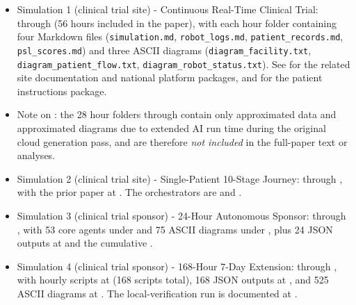 \begin{itemize}[leftmargin=*]
\item Simulation 1 (clinical trial site) - Continuous Real-Time
Clinical Trial:  through
 (56 hours included in the paper), with each hour
folder containing four Markdown files (\texttt{simulation.md},
\texttt{robot\_logs.md}, \texttt{patient\_records.md},
\texttt{psl\_scores.md}) and three ASCII diagrams
(\texttt{diagram\_facility.txt}, \texttt{diagram\_patient\_flow.txt},
\texttt{diagram\_robot\_status.txt}). See
\cite{kawchak_2026_19176370, kawchak_2026_19244918} for the related
site documentation and national platform packages, and
\cite{kawchak_2026_18810541} for the patient instructions package.

\item Note on : the 28 hour folders
 through
 contain only approximated data and approximated
diagrams due to extended AI run time during the original cloud
generation pass, and are therefore \emph{not included} in the
full-paper text or analyses.  

\clearpage

\item Simulation 2 (clinical trial site) - Single-Patient 10-Stage
Journey:  through
, with the prior paper at
. The
orchestrators are  and
 \cite{kawchak_2026_19119939}.

\item Simulation 3 (clinical trial sponsor) - 24-Hour Autonomous
Sponsor: 
through , with 53 core agents under
 and 75 ASCII diagrams
under , plus 24 JSON
outputs at  and the
cumulative 
\cite{kawchak_2026_19396256}.

\item Simulation 4 (clinical trial sponsor) - 168-Hour 7-Day
Extension:  through
, with hourly scripts at
 (168 scripts total), 168
JSON outputs at , and 525 ASCII diagrams
at . The local-verification run is documented
at
\cite{kawchak_2026_19396256}.
\end{itemize}

